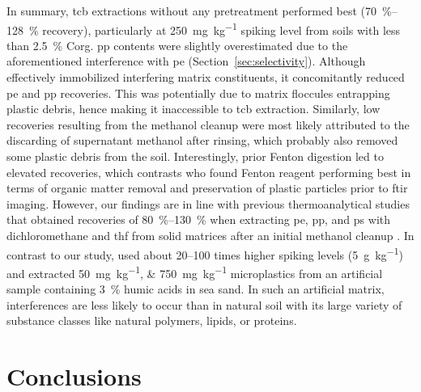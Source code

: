 In summary, \ac{tcb} extractions without any pretreatment performed best (\SIrange{70}{128}{\percent} recovery), particularly at \SI{250}{\milli\gram\per\kilo\gram} spiking level from soils with less than \SI{2.5}{\percent} \ac{Corg}. \Ac{pp} contents were slightly overestimated due to the aforementioned interference with \ac{pe} (Section~\ref{sec:selectivity}). Although  effectively immobilized interfering matrix constituents, it concomitantly reduced \ac{pe} and \ac{pp} recoveries. This was potentially due to matrix floccules entrapping plastic debris, hence making it inaccessible to \ac{tcb} extraction. Similarly, low recoveries resulting from the methanol cleanup were most likely attributed to the discarding of supernatant methanol after rinsing, which probably also removed some plastic debris from the soil. Interestingly, prior Fenton digestion led to elevated recoveries, which contrasts \citet{HurleyValidation2018} who found Fenton reagent performing best in terms of organic matter removal and preservation of plastic particles prior to \ac{ftir} imaging. However, our findings are in line with previous thermoanalytical studies that obtained recoveries of \SIrange{80}{130}{\percent} when extracting \ac{pe}, \ac{pp}, and \ac{ps} with dichloromethane and \ac{thf} from solid matrices after an initial methanol cleanup \citep{FullerProcedure2016,DierkesQuantification2019}. In contrast to our study, \citet{FullerProcedure2016} used about \numrange{20}{100} times higher spiking levels (\SI{5}{\gram\per\kilo\gram}) and \citet{DierkesQuantification2019} extracted \SIlist{50;750}{\milli\gram\per\kilo\gram} microplastics from an artificial sample containing \SI{3}{\percent} humic acids in sea sand. In such an artificial matrix, interferences are less likely to occur than in natural soil with its large variety of substance classes like natural polymers, lipids, or proteins.

\section{Conclusions}

